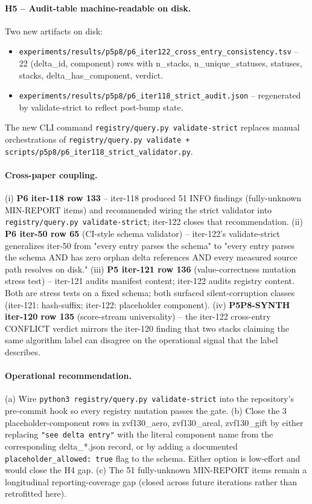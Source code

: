 \paragraph{H5 -- Audit-table machine-readable on disk.}
Two new artifacts on disk:
\begin{itemize}
\item \texttt{experiments/results/p5p8/p6\_iter122\_cross\_entry\_consistency.tsv}
      -- 22 (delta\_id, component) rows with n\_stacks, n\_unique\_statuses,
      statuses, stacks, delta\_has\_component, verdict.
\item \texttt{experiments/results/p5p8/p6\_iter118\_strict\_audit.json}
      -- regenerated by validate-strict to reflect post-bump state.
\end{itemize}
The new CLI command \texttt{registry/query.py validate-strict} replaces
manual orchestrations of \texttt{registry/query.py validate +
scripts/p5p8/p6\_iter118\_strict\_validator.py}.

\paragraph{Cross-paper coupling.}
(i) \textbf{P6 iter-118 row 133} -- iter-118 produced 51 INFO findings
(fully-unknown MIN-REPORT items) and recommended wiring the strict
validator into \texttt{registry/query.py validate-strict}; iter-122
closes that recommendation. (ii) \textbf{P6 iter-50 row 65} (CI-style
schema validator) -- iter-122's validate-strict generalizes iter-50
from "every entry parses the schema" to "every entry parses the schema
AND has zero orphan delta references AND every measured source path
resolves on disk." (iii) \textbf{P5 iter-121 row 136} (value-correctness
mutation stress test) -- iter-121 audits manifest content; iter-122
audits registry content. Both are stress tests on a fixed schema; both
surfaced silent-corruption classes (iter-121: hash-suffix; iter-122:
placeholder component). (iv) \textbf{P5P8-SYNTH iter-120 row 135}
(score-stream universality) -- the iter-122 cross-entry CONFLICT
verdict mirrors the iter-120 finding that two stacks claiming the same
algorithm label can disagree on the operational signal that the label
describes.

\paragraph{Operational recommendation.}
(a) Wire \texttt{python3 registry/query.py validate-strict} into the
repository's pre-commit hook so every registry mutation passes the gate.
(b) Close the 3 placeholder-component rows in zvf130\_aero, zvf130\_areal,
zvf130\_gift by either replacing \texttt{"see delta entry"} with the
literal component name from the corresponding delta\_*.json record, or
by adding a documented \texttt{placeholder\_allowed: true} flag to the
schema. Either option is low-effort and would close the H4 gap. (c)
The 51 fully-unknown MIN-REPORT items remain a longitudinal
reporting-coverage gap (closed across future iterations rather than
retrofitted here).